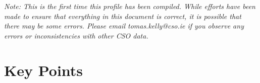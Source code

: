 \documentclass{article}
\begin{document}
     	     \begin{center}
        \emph{Note: This is the first time this profile has been compiled. While efforts have been made to ensure that everything in this document is correct, it is possible that there may be some errors. Please email tomas.kelly@cso.ie if you observe any errors or inconsistencies with other CSO data.}
     \end{center}
  \pagebreak
    	    \tableofcontents

\pagebreak


\section{Key Points}
\end{document}
